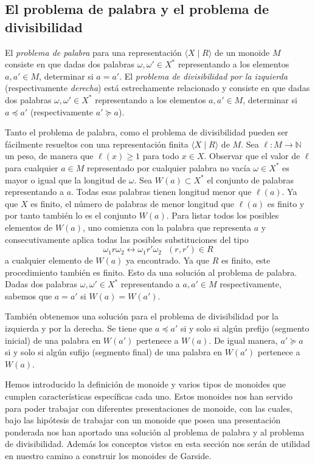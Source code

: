 \documentclass[12pt]{book}
\theoremstyle{definition}
\begin{document}
\subsection{El problema de palabra y el problema de divisibilidad}
\label{sec:pro_palabra}
El \textit{problema de palabra} para una representación $\langle X\mid R\rangle$ de un monoide $M$ consiste en que dadas dos palabras $\omega,\omega'\in X^*$ representando a los elementos $a,a'\in M$, determinar si $a=a'$. El \textit{problema de divisibilidad por la izquierda} (respectivamente \textit{derecha}) está estrechamente relacionado y consiste en que dadas
dos palabras $\omega,\omega'\in X^*$ representando a los elementos $a,a'\in M$, determinar si $a\preceq a'$ (respectivamente $a'\succeq a$).

Tanto el problema de palabra, como el problema de divisibilidad pueden ser fácilmente resueltos con una representación finita $\langle X\mid R\rangle$ de $M$. Sea $\ell:M\rightarrow\mathbb{N}$ un peso, de manera que $\ell(x)\geq 1$ para todo $x\in X$. Observar que el valor de $\ell$ para cualquier $a\in M$ representado por cualquier palabra no vacía $\omega\in X^*$ es mayor o igual que la longitud de $\omega$. Sea $W(a)\subset X^*$ el conjunto de palabras representando a $a$. Todas esas palabras tienen longitud menor que $\ell(a)$. Ya que $X$ es finito, el número de palabras de menor longitud que $\ell(a)$ es finito y por tanto también lo es el conjunto $W(a)$. Para listar todos los posibles elementos de $W(a)$, uno comienza con la palabra que representa $a$ y consecutivamente aplica todas las posibles substituciones del tipo
$$\omega_1 r\omega_2\leftrightarrow \omega_1 r'\omega_2\ \ \ (r,r')\in R$$
a cualquier elemento de $W(a)$ ya encontrado. Ya que $R$ es finito, este procedimiento también es finito. Esto da una solución al problema de palabra. Dadas dos palabras $\omega,\omega'\in X^*$ representando a $a,a'\in M$ respectivamente, sabemos que $a=a'$ si $W(a)=W(a')$.

También obtenemos una solución para el problema de divisibilidad por la izquierda y por la derecha. Se tiene que $a\preceq a'$ si y solo si algún prefijo (segmento inicial) de una palabra en $W(a')$ pertenece a $W(a)$. De igual manera, $a'\succeq a$ si y solo si algún sufijo (segmento final) de una palabra en $W(a')$ pertenece a $W(a)$.

Hemos introducido la definición de monoide y varios tipos de monoides que cumplen características específicas cada uno. Estos monoides nos han servido para poder trabajar con diferentes presentaciones de monoide, con las cuales, bajo las hipótesis de trabajar con un monoide que posea una presentación ponderada nos han aportado una solución al problema de palabra y al problema de divisibilidad. Además los conceptos vistos en esta sección nos serán de utilidad en nuestro camino a construir los monoides de Garside.
\end{document}
